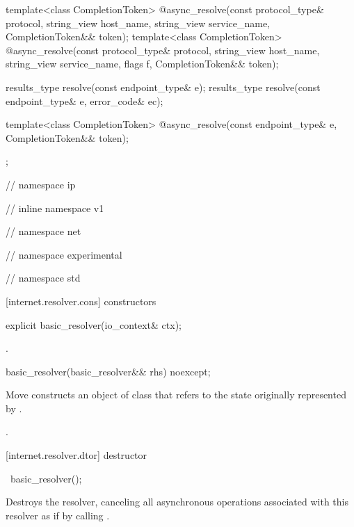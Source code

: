 \begin{codeblock}
{{{{{{    template<class CompletionToken>
      @\DEDUCED@ async_resolve(const protocol_type& protocol,
                            string_view host_name, string_view service_name,
                            CompletionToken&& token);
    template<class CompletionToken>
      @\DEDUCED@ async_resolve(const protocol_type& protocol,
                            string_view host_name, string_view service_name,
                            flags f, CompletionToken&& token);

    results_type resolve(const endpoint_type& e);
    results_type resolve(const endpoint_type& e, error_code& ec);

    template<class CompletionToken>
      @\DEDUCED@ async_resolve(const endpoint_type& e,
                            CompletionToken&& token);
  };

} // namespace ip
} // inline namespace v1
} // namespace net
} // namespace experimental
} // namespace std
\end{codeblock}


[internet.resolver.cons]{ constructors}

\begin{itemdecl}
explicit basic_resolver(io_context& ctx);
\end{itemdecl}

\begin{itemdescr}
\pnum
\postconditions {}.
\end{itemdescr}

\begin{itemdecl}
basic_resolver(basic_resolver&& rhs) noexcept;
\end{itemdecl}

\begin{itemdescr}
\pnum
\effects Move constructs an object of class  that refers to the state originally represented by .

\pnum
\postconditions {}.
\end{itemdescr}



[internet.resolver.dtor]{ destructor}

\begin{itemdecl}
~basic_resolver();
\end{itemdecl}

\begin{itemdescr}
\pnum
\effects Destroys the resolver, canceling all asynchronous operations associated with this resolver as if by calling .
\end{itemdescr}



